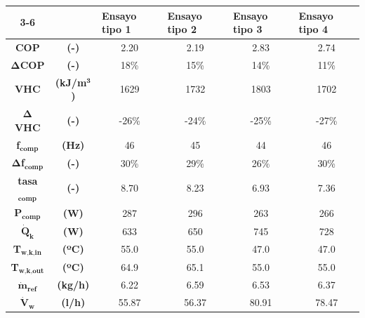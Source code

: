 
\begin{tabular}{cc|c|c|c|c|}
\cline{3-6}
\multicolumn{1}{l}{} & \multicolumn{1}{l|}{} & \multicolumn{1}{l|}{\textbf{Ensayo tipo 1}} & \multicolumn{1}{l|}{\textbf{Ensayo tipo 2}} & \multicolumn{1}{l|}{\textbf{Ensayo tipo 3}} & \multicolumn{1}{l|}{\textbf{Ensayo tipo 4}} \\ \hline
\multicolumn{1}{|c}{\textbf{COP}} & \textbf{(-)} & 2.20 & 2.19 & 2.83 & 2.74 \\ \hline
\multicolumn{1}{|c}{$\bm{\Delta}$\textbf{COP}} & \textbf{(-)} & 18\% & 15\% & 14\% & 11\% \\ \hline
\multicolumn{1}{|c}{\textbf{VHC}} & \textbf{(kJ/m$^\textbf{3}$)} & 1629 & 1732 & 1803 & 1702 \\ \hline
\multicolumn{1}{|c}{$\bm{\Delta}$\textbf{VHC}} & \textbf{(-)} & -26\% & -24\% & -25\% & -27\% \\ \hline
\multicolumn{1}{|c}{\textbf{f}$_\textbf{comp}$} & \textbf{(Hz)} & 46 & 45 & 44 & 46 \\ \hline
\multicolumn{1}{|c}{$\bm{\Delta}$\textbf{f}$_\textbf{comp}$} & \textbf{(-)} & 30\% & 29\% & 26\% & 30\% \\ \hline
\multicolumn{1}{|c}{\textbf{tasa}$_\textbf{comp}$} & \textbf{(-)} & 8.70 & 8.23 & 6.93 & 7.36 \\ \hline
\multicolumn{1}{|c}{\textbf{P}$_\textbf{comp}$} & \textbf{(W)} & 287 & 296 & 263 & 266 \\ \hline
\multicolumn{1}{|c}{$\dot{\textbf{Q}}_\textbf{k}$} & \textbf{(W)} & 633 & 650 & 745 & 728 \\ \hline
\multicolumn{1}{|c}{\textbf{T}$_\textbf{w,k,in}$} & \textbf{(ºC)} & 55.0 & 55.0 & 47.0 & 47.0 \\ \hline
\multicolumn{1}{|c}{\textbf{T}$_\textbf{w,k,out}$} & \textbf{(ºC)} & 64.9 & 65.1 & 55.0 & 55.0 \\ \hline
\multicolumn{1}{|c}{$\dot{\textbf{m}}_\textbf{ref}$} & \textbf{(kg/h)} & 6.22 & 6.59 & 6.53 & 6.37 \\ \hline
\multicolumn{1}{|c}{$\dot{\textbf{V}}_\textbf{w}$} & \textbf{(l/h)} & 55.87 & 56.37 & 80.91 & 78.47 \\ \hline
\end{tabular}
